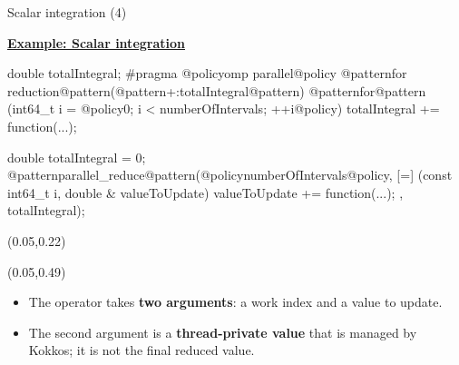 \begin{frame}[fragile]{Scalar integration (4)}

  \ul{\textbf{Example: Scalar integration}}

  \vspace{5pt}

  \begin{code}[linebackgroundcolor={
        \btLstHL<1->{4}{bodyColor}
      },
      frame=single
    ]
double totalIntegral;
#pragma @policyomp parallel@policy @patternfor reduction@pattern(@pattern+:totalIntegral@pattern)
@patternfor@pattern (int64_t i = @policy0; i < numberOfIntervals; ++i@policy) {
  totalIntegral += function(...);
}
  \end{code}

  \begin{code}[linebackgroundcolor={
        \btLstHL<1->{4}{bodyColor}
      },
      frame=single
    ]
double totalIntegral = 0;
@patternparallel_reduce@pattern(@policynumberOfIntervals@policy,
  [=] (const int64_t i, double & valueToUpdate) {
    valueToUpdate += function(...);
  },
  totalIntegral);
  \end{code}

  \begin{textblock*}{0.5\textwidth}(0.05\textwidth,0.22\textheight)
  \end{textblock*}

  \begin{textblock*}{0.5\textwidth}(0.05\textwidth,0.49\textheight)
  \end{textblock*}

  \vspace{-5pt}

  \begin{itemize}
  \item The operator takes \textbf{two arguments}: a work index and a
  value to update.
  \item The second argument is a \textbf{thread-private value} that is
  managed by Kokkos; it is not the final reduced value.
  \end{itemize}

\end{frame}


